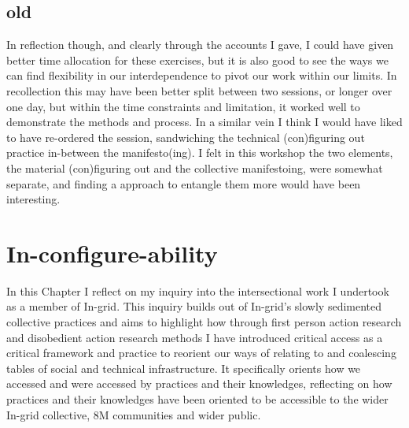 \hypertarget{old}{%
\subsection[old]{\texorpdfstring{\protect\hypertarget{anchor}{}{}old}{old}}\label{old}}

In reflection though, and clearly through the accounts I gave, I could
have given better time allocation for these exercises, but it is also
good to see the ways we can find flexibility in our interdependence to
pivot our work within our limits. In recollection this may have been
better split between two sessions, or longer over one day, but within
the time constraints and limitation, it worked well to demonstrate the
methods and process. In a similar vein I think I would have liked to
have re-ordered the session, sandwiching the technical (con)figuring out
practice in-between the manifesto(ing). I felt in this workshop the two
elements, the material (con)figuring out and the collective
manifestoing, were somewhat separate, and finding a approach to entangle
them more would have been interesting.

\hypertarget{in-configure-ability-1}{%
\section[In-configure-ability]{\texorpdfstring{\protect\hypertarget{anchor}{}{}In-configure-ability}{In-configure-ability}}\label{in-configure-ability-1}}

In this Chapter I reflect on my inquiry into the intersectional work I
undertook as a member of In-grid. This inquiry builds out of In-grid's
slowly sedimented collective practices and aims to highlight how through
first person action research and disobedient action research methods I
have introduced critical access as a critical framework and practice to
reorient our ways of relating to and coalescing tables of social and
technical infrastructure. It specifically orients how we accessed and
were accessed by practices and their knowledges, reflecting on how
practices and their knowledges have been oriented to be accessible to
the wider In-grid collective, 8M communities and wider public.

